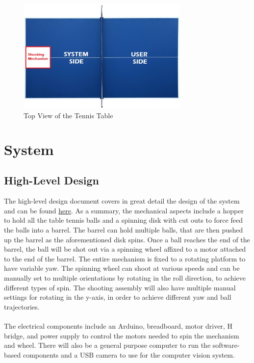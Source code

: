 \documentclass[11pt]{article}
\begin{document}
\begin{figure}[H]
   \centering
   \includegraphics[width=0.75\textwidth]{img/Table-Tennis-Top-View.png}
   \caption{Top View of the Tennis Table}
   \label{fig:table-tennis-top-view}
\end{figure}

\section{System}
\subsection{High-Level Design}
The high-level design document covers in great detail the design of the system and can be found \href{run:../SystemDesign/Design.pdf}{here}. As a summary, the mechanical aspects include a hopper to hold all the table tennis balls and a spinning disk with cut outs to force feed the balls into a barrel. The barrel can hold multiple balls, that are then pushed up the barrel as the aforementioned disk spins. Once a ball reaches the end of the barrel, the ball will be shot out via a spinning wheel affixed to a motor attached to the end of the barrel. The entire mechanism is fixed to a rotating platform to have variable yaw. The spinning wheel can shoot at various speeds and can be manually set to multiple orientations by rotating in the roll direction, to achieve different types of spin. The shooting assembly will also have multiple manual settings for rotating in the y-axis, in order to achieve different yaw and ball trajectories.  \\ \\
The electrical components include an Arduino, breadboard, motor driver, H bridge, and power supply to control the motors needed to spin the mechanism and wheel. There will also be a general purpose computer to run the software-based components and a USB camera to use for the computer vision system. 
\end{document}
